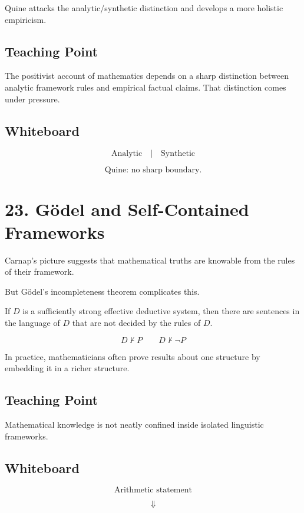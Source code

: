 \documentclass[11pt]{article}
\begin{document}
Quine attacks the analytic/synthetic distinction and develops a more holistic empiricism.

\subsection*{Teaching Point}

The positivist account of mathematics depends on a sharp distinction between analytic
framework rules and empirical factual claims. That distinction comes under pressure.

\subsection*{Whiteboard}

\[
\text{Analytic}
\quad \big| \quad
\text{Synthetic}
\]

\[
\text{Quine: no sharp boundary.}
\]

\section*{23. G\"odel and Self-Contained Frameworks}

Carnap's picture suggests that mathematical truths are knowable from the rules of their
framework.

But G\"odel's incompleteness theorem complicates this.

If \(D\) is a sufficiently strong effective deductive system, then there are sentences in the
language of \(D\) that are not decided by the rules of \(D\).

\[
D \nvdash P
\qquad
D \nvdash \neg P
\]

In practice, mathematicians often prove results about one structure by embedding it in a
richer structure.

\subsection*{Teaching Point}

Mathematical knowledge is not neatly confined inside isolated linguistic frameworks.

\subsection*{Whiteboard}

\[
\text{Arithmetic statement}
\]

\[
\Downarrow
\]
\end{document}
